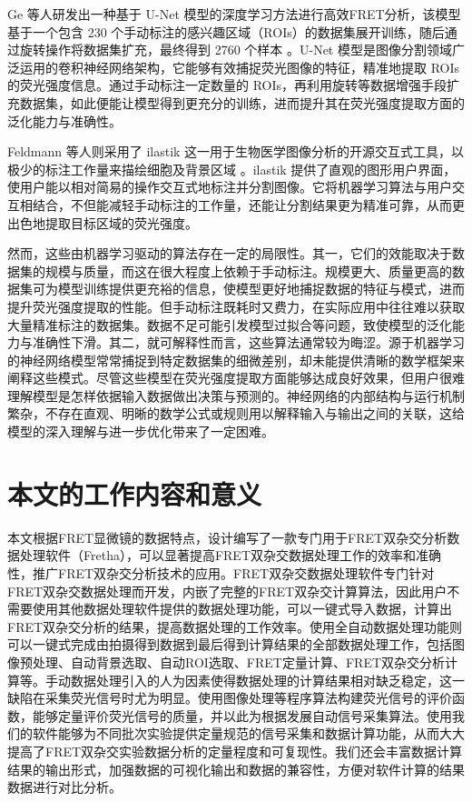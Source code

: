 Ge 等人研发出一种基于 U-Net  模型的深度学习方法进行高效FRET分析，该模型基于一个包含 230 个手动标注的感兴趣区域（ROIs）的数据集展开训练，随后通过旋转操作将数据集扩充，最终得到 2760 个样本 。U-Net 模型是图像分割领域广泛运用的卷积神经网络架构，它能够有效捕捉荧光图像的特征，精准地提取 ROIs 的荧光强度信息。通过手动标注一定数量的 ROIs，再利用旋转等数据增强手段扩充数据集，如此便能让模型得到更充分的训练，进而提升其在荧光强度提取方面的泛化能力与准确性。

Feldmann 等人则采用了 ilastik  这一用于生物医学图像分析的开源交互式工具，以极少的标注工作量来描绘细胞及背景区域 。ilastik 提供了直观的图形用户界面，使用户能以相对简易的操作交互式地标注并分割图像。它将机器学习算法与用户交互相结合，不但能减轻手动标注的工作量，还能让分割结果更为精准可靠，从而更出色地提取目标区域的荧光强度。

然而，这些由机器学习驱动的算法存在一定的局限性。其一，它们的效能取决于数据集的规模与质量，而这在很大程度上依赖于手动标注。规模更大、质量更高的数据集可为模型训练提供更充裕的信息，使模型更好地捕捉数据的特征与模式，进而提升荧光强度提取的性能。但手动标注既耗时又费力，在实际应用中往往难以获取大量精准标注的数据集。数据不足可能引发模型过拟合等问题，致使模型的泛化能力与准确性下滑。其二，就可解释性而言，这些算法通常较为晦涩。源于机器学习的神经网络模型常常捕捉到特定数据集的细微差别，却未能提供清晰的数学框架来阐释这些模式。尽管这些模型在荧光强度提取方面能够达成良好效果，但用户很难理解模型是怎样依据输入数据做出决策与预测的。神经网络的内部结构与运行机制繁杂，不存在直观、明晰的数学公式或规则用以解释输入与输出之间的关联，这给模型的深入理解与进一步优化带来了一定困难。
\fi

\section{本文的工作内容和意义}

\ifshowtext
本文根据FRET显微镜的数据特点，设计编写了一款专门用于FRET双杂交分析数据处理软件（Fretha），可以显著提高FRET双杂交数据处理工作的效率和准确性，推广FRET双杂交分析技术的应用。FRET双杂交数据处理软件专门针对FRET双杂交数据处理而开发，内嵌了完整的FRET双杂交计算算法，因此用户不需要使用其他数据处理软件提供的数据处理功能，可以一键式导入数据，计算出FRET双杂交分析的结果，提高数据处理的工作效率。使用全自动数据处理功能则可以一键式完成由拍摄得到数据到最后得到计算结果的全部数据处理工作，包括图像预处理、自动背景选取、自动ROI选取、FRET定量计算、FRET双杂交分析计算等。手动数据处理引入的人为因素使得数据处理的计算结果相对缺乏稳定，这一缺陷在采集荧光信号时尤为明显。使用图像处理等程序算法构建荧光信号的评价函数，能够定量评价荧光信号的质量，并以此为根据发展自动信号采集算法。使用我们的软件能够为不同批次实验提供定量规范的信号采集和数据计算功能，从而大大提高了FRET双杂交实验数据分析的定量程度和可复现性。我们还会丰富数据计算结果的输出形式，加强数据的可视化输出和数据的兼容性，方便对软件计算的结果数据进行对比分析。

